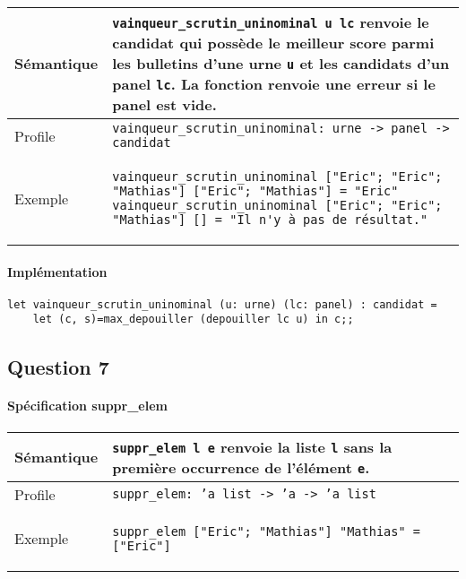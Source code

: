 \documentclass[french, 10pt, a4paper]{article}
\begin{document}
\begin{center}
	\begin{tabular}{|p{2cm}|p{\dimexpr\linewidth-2cm-4\tabcolsep-3\arrayrulewidth}|}
		\hline
		Sémantique
		&
		\texttt{vainqueur_scrutin_uninominal u lc} renvoie le candidat qui possède le meilleur score parmi les bulletins d'une urne \texttt{u} et les candidats d'un panel \texttt{lc}. La fonction renvoie une erreur si le panel est vide. %
%
		\\
		\hline
		Profile
		&
		\texttt{vainqueur_scrutin_uninominal: urne -> panel -> candidat}
%
		\\
		\hline
		Exemple
		&
		\begin{verbatim}
vainqueur_scrutin_uninominal ["Eric"; "Eric"; "Mathias"] ["Eric"; "Mathias"] = "Eric"
vainqueur_scrutin_uninominal ["Eric"; "Eric"; "Mathias"] [] = "Il n'y à pas de résultat."
		\end{verbatim}
%
		\\
		\hline
	\end{tabular}
\end{center}

\paragraph{Implémentation}

\begin{verbatim}
let vainqueur_scrutin_uninominal (u: urne) (lc: panel) : candidat =
	let (c, s)=max_depouiller (depouiller lc u) in c;;
\end{verbatim}



\subsection{Question 7}

\paragraph{Spécification suppr\_elem}

\begin{center}
	\begin{tabular}{|p{2cm}|p{\dimexpr\linewidth-2cm-4\tabcolsep-3\arrayrulewidth}|}
		\hline
		Sémantique
		&
		\texttt{suppr_elem l e} renvoie la liste \texttt{l} sans la première occurrence de l'élément \texttt{e}. %
%
		\\
		\hline
		Profile
		&
		\texttt{suppr_elem: 'a list -> 'a -> 'a list}
%
		\\
		\hline
		Exemple
		&
		\begin{verbatim}
suppr_elem ["Eric"; "Mathias"] "Mathias" = ["Eric"]
		\end{verbatim}
%
		\\
		\hline
	\end{tabular}
\end{center}
\end{document}
